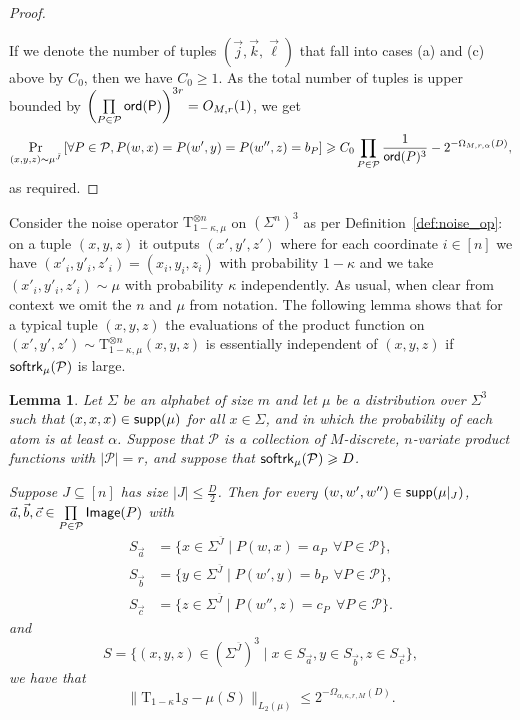 \documentclass[11pt]{article}
\newtheorem{lemma}[thm]{Lemma}
\newcommand\Prob[2]{{\Pr_{#1}\left[ {#2} \right]}}
\newcommand\norm[1]{\| #1 \|}
\renewcommand\geq{\geqslant}
\renewcommand\leq{\leqslant}
\begin{document}
\begin{proof}
\begin{enumerate}
     \end{enumerate}
     If we denote the number of tuples $(\vec{j}, \vec{k}, \vec{\ell})$ that fall into cases (a) and (c) above by $C_0$, then we have $C_0\geq 1$. As the total number of tuples is upper bounded by $\left(\prod\limits_{P\in\mathcal{P}} {\sf ord (P)}\right)^{3r} = O_{M, r}(1)$, we get 
       \begin{align*}
          \Prob{(x,y,z)\sim\mu^{\bar{J}}}{\forall P\in \mathcal{P}, P(w,x)=P(w', y)=P(w'', z) = b_P}\geq C_0\prod\limits_{P\in\mathcal{P}}\frac{1}{{\sf ord}(P)^3}-2^{-\Omega_{M,r,\alpha}(D)},
      \end{align*}
      as required.
    \end{proof}

Consider the noise operator $\mathrm{T}_{1-\kappa,\mu}^{\otimes n}$ on $(\Sigma^n)^3$ as per Definition~\ref{def:noise_op}: on a tuple $(x, y, z)$ it outputs $(x', y', z')$ where for each coordinate $i\in [n]$ we have $(x'_i,y'_i,z'_i) = (x_i, y_i, z_i)$ with probability $1-\kappa$ and we take $(x'_i,y'_i,z'_i)\sim \mu$  with probability $\kappa$ independently. As usual, when clear from context we omit the $n$ and $\mu$ from notation. The following lemma shows that for a typical tuple $(x, y, z)$ the evaluations of the product function on $(x',y',z')\sim \mathrm{T}_{1-\kappa,\mu}^{\otimes n}(x, y, z)$ is essentially independent of $(x, y, z)$ if ${\sf softrk}_{\mu}(\mathcal{P})$ is large.
\begin{lemma}
\label{lemma:noise_condition_uniform}
    Let $\Sigma$ be an alphabet of size $m$ and let $\mu$ be a distribution over $\Sigma^{3}$ such that $(x,x,x)\in {\sf supp}(\mu)$ for all $x\in\Sigma$, and in which the probability of each atom is at least $\alpha$.
		Suppose that $\mathcal{P}$ is a collection of $M$-discrete, $n$-variate product functions with $|\mathcal{P}|=r$, and suppose that ${\sf softrk}_{\mu}(\mathcal{P})\geq D$. 
        
        Suppose $J\subseteq [n]$ has size $|J|\leq \frac{D}{2}$. Then for every $(w, w', w'') \in {\sf supp}(\mu|_{J})$, $\vec{a},\vec{b}, \vec{c} \in\prod\limits_{P\in\mathcal{P}}{\sf Image}(P)$ with 
       \begin{align*}
           S_{\vec{a}} &= \{ x\in \Sigma^{\overline{J}} \mid P(w, x) = a_P~~\forall P\in \mathcal{P}\},\\
         S_{\vec{b}} &= \{ y\in \Sigma^{\overline{J}} \mid P(w', y) = b_P~~\forall P\in \mathcal{P}\}, \\
           S_{\vec{c}} &= \{ z\in \Sigma^{\overline{J}} \mid P(w'', z) = c_P~~\forall P\in \mathcal{P}\}.
       \end{align*}
       and
        \[
        S = \{ (x, y, z) \in (\Sigma^{\overline{J}})^3 \mid x\in S_{\vec{a}}, y\in S_{\vec{b}}, z\in S_{\vec{c}}\},
        \]
        we have that
		\[
        \norm{\mathrm{T}_{1-\kappa}1_S - \mu(S)}_{L_2(\mu)} \leq 2^{-\Omega_{\alpha, \kappa, r, M}(D)}.
        \]
	\end{lemma}
\end{document}
